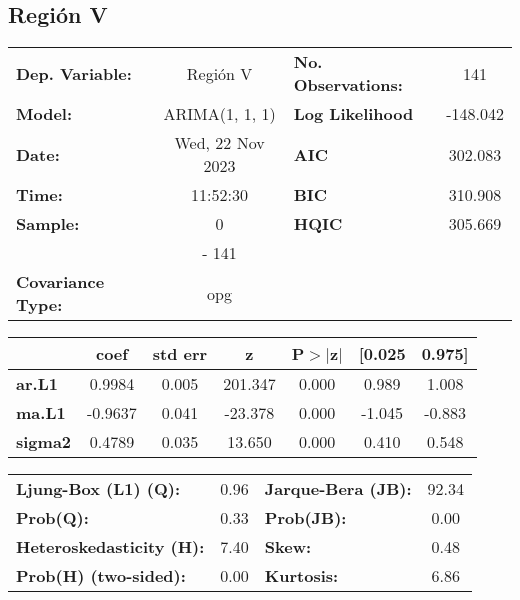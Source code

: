 \documentclass{article}%
\begin{document}
\subsection*{Región V}%
\begin{center}
\begin{tabular}{lclc}
\toprule
\textbf{Dep. Variable:}          &     Región V     & \textbf{  No. Observations:  } &    141      \\
\textbf{Model:}                  &  ARIMA(1, 1, 1)  & \textbf{  Log Likelihood     } &  -148.042   \\
\textbf{Date:}                   & Wed, 22 Nov 2023 & \textbf{  AIC                } &  302.083    \\
\textbf{Time:}                   &     11:52:30     & \textbf{  BIC                } &  310.908    \\
\textbf{Sample:}                 &        0         & \textbf{  HQIC               } &  305.669    \\
\textbf{}                        &       - 141      & \textbf{                     } &             \\
\textbf{Covariance Type:}        &       opg        & \textbf{                     } &             \\
\bottomrule
\end{tabular}
\begin{tabular}{lcccccc}
                & \textbf{coef} & \textbf{std err} & \textbf{z} & \textbf{P$> |$z$|$} & \textbf{[0.025} & \textbf{0.975]}  \\
\midrule
\textbf{ar.L1}  &       0.9984  &        0.005     &   201.347  &         0.000        &        0.989    &        1.008     \\
\textbf{ma.L1}  &      -0.9637  &        0.041     &   -23.378  &         0.000        &       -1.045    &       -0.883     \\
\textbf{sigma2} &       0.4789  &        0.035     &    13.650  &         0.000        &        0.410    &        0.548     \\
\bottomrule
\end{tabular}
\begin{tabular}{lclc}
\textbf{Ljung-Box (L1) (Q):}     & 0.96 & \textbf{  Jarque-Bera (JB):  } & 92.34  \\
\textbf{Prob(Q):}                & 0.33 & \textbf{  Prob(JB):          } &  0.00  \\
\textbf{Heteroskedasticity (H):} & 7.40 & \textbf{  Skew:              } &  0.48  \\
\textbf{Prob(H) (two-sided):}    & 0.00 & \textbf{  Kurtosis:          } &  6.86  \\
\bottomrule
\end{tabular}
\end{center}
\end{document}
